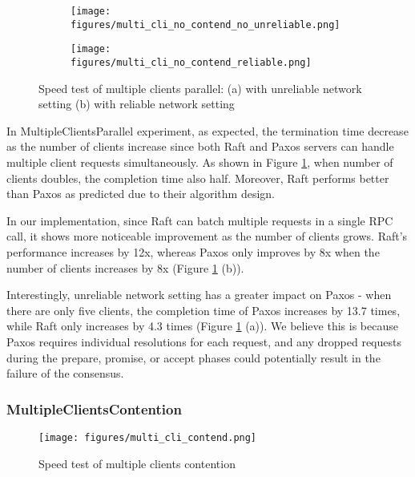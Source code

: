 \documentclass[11pt,a4paper]{article}
\begin{document}
\begin{figure}[!ht]
    \begin{subfigure}{0.48\textwidth}
        \texttt{[image: figures/multi\_cli\_no\_contend\_no\_unreliable.png]}
        \caption{}
    \end{subfigure}
    \hfill
    \begin{subfigure}{0.48\textwidth}
        \texttt{[image: figures/multi\_cli\_no\_contend\_reliable.png]}
        \caption{}
    \end{subfigure}
    \caption{Speed test of multiple clients parallel: (a) with unreliable network setting (b) with reliable network setting}
    \label{fig:speed_MultipleClientsParallel}
\end{figure}

In MultipleClientsParallel experiment, as expected, the termination time decrease as the number of clients increase since both Raft and Paxos servers can handle multiple client requests simultaneously. As shown in Figure \ref{fig:speed_MultipleClientsParallel}, when number of clients doubles, the completion time also half. Moreover, Raft performs better than Paxos as predicted due to their algorithm design.

In our implementation, since Raft can batch multiple requests in a single RPC call, it shows more noticeable improvement as the number of clients grows. Raft's performance increases by 12x, whereas Paxos only improves by 8x when the number of clients increases by 8x (Figure \ref{fig:speed_MultipleClientsParallel} (b)).

Interestingly, unreliable network setting has a greater impact on Paxos - when there are only five clients, the completion time of Paxos increases by 13.7 times, while Raft only increases by 4.3 times (Figure \ref{fig:speed_MultipleClientsParallel} (a)). We believe this is because Paxos requires individual resolutions for each request, and any dropped requests during the prepare, promise, or accept phases could potentially result in the failure of the consensus.

\subsubsection{MultipleClientsContention}

\begin{figure}[!ht]
\centering
\texttt{[image: figures/multi\_cli\_contend.png]}
\caption{\label{fig:speed_MultipleClientsContention}Speed test of multiple clients contention}
\end{figure}
\end{document}
